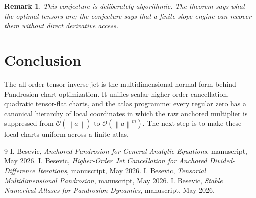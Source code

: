 \documentclass[11pt]{article}
\newtheorem{remark}[definition]{Remark}
\newcommand{\Oterm}{\mathcal O}
\newcommand{\norm}[1]{\left\lVert #1\right\rVert}
\begin{document}
\begin{remark}
This conjecture is deliberately algorithmic. The theorem says what the optimal tensors are; the conjecture says that a finite-slope engine can recover them without direct derivative access.
\end{remark}

\section{Conclusion}

The all-order tensor inverse jet is the multidimensional normal form behind Pandrosion chart optimization. It unifies scalar higher-order cancellation, quadratic tensor-flat charts, and the atlas programme: every regular zero has a canonical hierarchy of local coordinates in which the raw anchored multiplier is suppressed from \(\Oterm(\norm{a})\) to \(\Oterm(\norm{a}^m)\). The next step is to make these local charts uniform across a finite atlas.

\begin{thebibliography}{9}
I. Besevic, \emph{Anchored Pandrosion for General Analytic Equations}, manuscript, May 2026.
I. Besevic, \emph{Higher-Order Jet Cancellation for Anchored Divided-Difference Iterations}, manuscript, May 2026.
I. Besevic, \emph{Tensorial Multidimensional Pandrosion}, manuscript, May 2026.
I. Besevic, \emph{Stable Numerical Atlases for Pandrosion Dynamics}, manuscript, May 2026.
\end{thebibliography}
\end{document}
